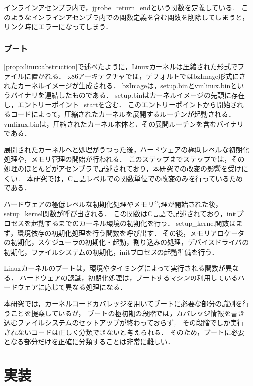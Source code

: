 \documentclass[graduation-thesis]{mlarticle}
\begin{document}
インラインアセンブラ内で，jprobe\_return\_endという関数を定義している．
このようなインラインアセンブラ内での関数定義を含む関数を削除してしまうと，リンク時にエラーになってしまう．


\subsubsection{ブート}
\label{propo:linux:boot}

\ref{propo:linux:abstruction}で述べたように，Linuxカーネルは圧縮された形式でファイルに置かれる．
x86アーキテクチャでは，デフォルトではbzImage形式にされたカーネルイメージが生成される．
bzImageは，setup.binとvmlinux.binというバイナリを連結したものである．
setup.binはカーネルイメージの先頭に存在し，エントリーポイント\_startを含む．
このエントリーポイントから開始されるコードによって，圧縮されたカーネルを展開するルーチンが起動される．
vmlinux.binは，圧縮されたカーネル本体と，その展開ルーチンを含むバイナリである．

展開されたカーネルへと処理がうつった後，ハードウェアの極低レベルな初期化処理や，メモリ管理の開始が行われる．
このステップまでステップでは，その処理のほとんどがアセンブラで記述されており，本研究での改変の影響を受けにくい．
本研究では，C言語レベルでの関数単位での改変のみを行っているためである．

ハードウェアの極低レベルな初期化処理やメモリ管理が開始された後，setup\_kernel関数が呼び出される．
この関数はC言語で記述されており，initプロセスを起動するまでのカーネル環境の初期化を行う．
setup\_kernel関数はまず，環境依存の初期化処理を行う関数を呼び出す．
その後，メモリアロケータの初期化，スケジューラの初期化・起動，割り込みの処理，デバイスドライバの初期化，ファイルシステムの初期化，initプロセスの起動準備を行う．

Linuxカーネルのブートは，環境やタイミングによって実行される関数が異なる．
ハードウェアの認識，初期化処理は，ブートするマシンの利用しているハードウェアに応じて異なる処理になる．

本研究では，カーネルコードカバレッジを用いてブートに必要な部分の識別を行うことを提案しているが，
ブートの極初期の段階では，カバレッジ情報を書き込むファイルシステムのセットアップが終わっておらず，
その段階でしか実行されないコードは正しく分類できないと考えられる．
そのため，ブートに必要となる部分だけを正確に分類することは非常に難しい．


\clearpage
\section{実装}
\label{implementation}
\end{document}
